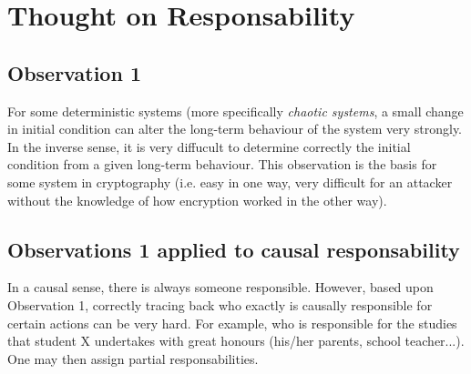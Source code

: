\documentclass[../main/main.tex]{subfiles}
\begin{document}
\section{Thought on Responsability}

\subsection{Observation 1}
For some deterministic systems (more specifically \textit{chaotic systems}, a small change in initial condition can alter the long-term behaviour of the system very strongly. In the inverse sense, it is very diffucult to determine correctly the initial condition from a given long-term behaviour. This observation is the basis for some system in cryptography (i.e. easy in one way, very difficult for an attacker without the knowledge of how encryption worked in the other way).

\subsection{Observations 1 applied to causal responsability}
\label{observation_causal_respo}
In a causal sense, there is always someone responsible. However, based upon Observation 1, correctly tracing back who exactly is causally responsible for certain actions can be very hard. For example, who is responsible for the studies that student X undertakes with great honours (his/her parents, school teacher...). One may then assign partial responsabilities. 
\end{document}
